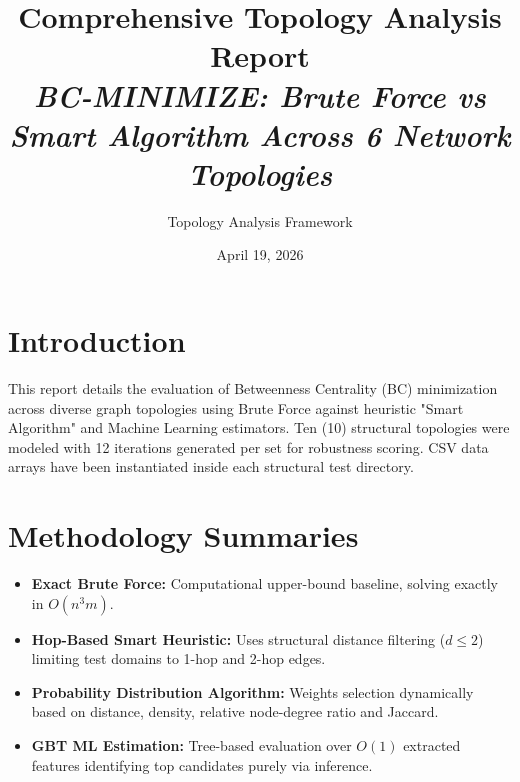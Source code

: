 \documentclass[11pt]{article}
\title{\textbf{Comprehensive Topology Analysis Report}\\
\textit{BC-MINIMIZE: Brute Force vs Smart Algorithm Across 6 Network Topologies}}
\author{Topology Analysis Framework}
\date{April 19, 2026}
\begin{document}
\maketitle

\section{Introduction}
This report details the evaluation of Betweenness Centrality (BC) minimization across diverse graph topologies using Brute Force against heuristic "Smart Algorithm" and Machine Learning estimators. 
Ten (10) structural topologies were modeled with 12 iterations generated per set for robustness scoring. CSV data arrays have been instantiated inside each structural test directory.

\section{Methodology Summaries}
\begin{itemize}
    \item \textbf{Exact Brute Force:} Computational upper-bound baseline, solving exactly in $O(n^3m)$.
    \item \textbf{Hop-Based Smart Heuristic:} Uses structural distance filtering ($d \leq 2$) limiting test domains to 1-hop and 2-hop edges.
    \item \textbf{Probability Distribution Algorithm:} Weights selection dynamically based on distance, density, relative node-degree ratio and Jaccard.
    \item \textbf{GBT ML Estimation:} Tree-based evaluation over $O(1)$ extracted features identifying top candidates purely via inference.
\end{itemize}
\end{document}
